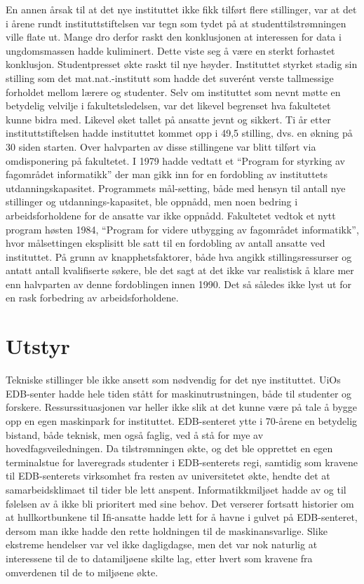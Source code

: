 \documentclass[../../main.tex]{subfiles}
\begin{document}
En annen årsak til at det nye instituttet ikke fikk tilført flere stillinger, var at det i årene rundt instituttstiftelsen var tegn som tydet på at studenttilstrømningen ville flate ut. Mange dro derfor raskt den konklusjonen at interessen for data i ungdomsmassen hadde kuliminert. Dette viste seg å være en sterkt forhastet konklusjon. Studentpresset økte raskt til nye høyder. Instituttet styrket stadig sin stilling som det mat.nat.-institutt som hadde det suverént verste tallmessige forholdet mellom lærere og studenter. Selv om instituttet som nevnt møtte en betydelig velvilje i fakultetsledelsen, var det likevel begrenset hva fakultetet kunne bidra med. Likevel øket tallet på ansatte jevnt og sikkert. Ti år etter instituttstiftelsen hadde instituttet kommet opp i 49,5 stilling, dvs. en økning på 30 siden starten. Over halvparten av disse stillingene var blitt tilført via omdisponering på fakultetet. I 1979 hadde vedtatt et ``Program for styrking av fagområdet informatikk'' der man gikk inn for en fordobling av instituttets utdanningskapasitet. Programmets mål-setting, både med hensyn til antall nye stillinger og utdannings-kapasitet, ble oppnådd, men noen bedring i arbeidsforholdene for de ansatte var ikke oppnådd. Fakultetet vedtok et nytt program høsten 1984, ``Program for videre utbygging av fagområdet informatikk'', hvor målsettingen eksplisitt ble satt til en fordobling av antall ansatte ved instituttet. På grunn av knapphetsfaktorer, både hva angikk stillingsressurser og antatt antall kvalifiserte søkere, ble det sagt at det ikke var realistisk å klare mer enn halvparten av denne fordoblingen innen 1990. Det så således ikke lyst ut for en rask forbedring av arbeidsforholdene.

\section{Utstyr}

Tekniske stillinger ble ikke ansett som nødvendig for det nye instituttet. UiOs EDB-senter hadde hele tiden stått for maskinutrustningen, både til studenter og forskere. Ressurssituasjonen var heller ikke slik at det kunne være på tale å bygge opp en egen maskinpark for instituttet. EDB-senteret ytte i 70-årene en betydelig bistand, både teknisk, men også faglig, ved å stå for mye av hovedfagsveiledningen. Da tilstrømningen økte, og det ble opprettet en egen terminalstue for laveregrads studenter i EDB-senterets regi, samtidig som kravene til EDB-senterets virksomhet fra resten av universitetet økte, hendte det at samarbeidsklimaet til tider ble lett anspent. Informatikkmiljøet hadde av og til følelsen av å ikke bli prioritert med sine behov. Det verserer fortsatt historier om at hullkortbunkene til Ifi-ansatte hadde lett for å havne i gulvet på EDB-senteret, dersom man ikke hadde den rette holdningen til de maskinansvarlige. Slike ekstreme hendelser var vel ikke dagligdagse, men det var nok naturlig at interessene til de to datamiljøene skilte lag, etter hvert som kravene fra omverdenen til de to miljøene økte.
\end{document}
